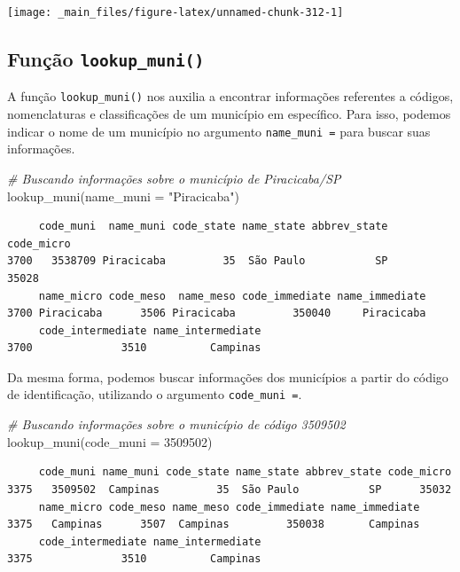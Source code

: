 \documentclass[
  brazilian,
]{book}
\newenvironment{Shaded}{\begin{snugshade}}{\end{snugshade}}
\newcommand{\AttributeTok}[1]{\textcolor[rgb]{0.77,0.63,0.00}{#1}}
\newcommand{\CommentTok}[1]{\textcolor[rgb]{0.56,0.35,0.01}{\textit{#1}}}
\newcommand{\DecValTok}[1]{\textcolor[rgb]{0.00,0.00,0.81}{#1}}
\newcommand{\FunctionTok}[1]{\textcolor[rgb]{0.00,0.00,0.00}{#1}}
\newcommand{\NormalTok}[1]{#1}
\newcommand{\StringTok}[1]{\textcolor[rgb]{0.31,0.60,0.02}{#1}}
\begin{document}
\begin{center}\texttt{[image: \_main\_files/figure-latex/unnamed-chunk-312-1]} \end{center}

\hypertarget{funuxe7uxe3o-lookup_muni}{%
\subsection{\texorpdfstring{Função \texttt{lookup\_muni()}}{Função lookup\_muni()}}\label{funuxe7uxe3o-lookup_muni}}

A função \texttt{lookup\_muni()} nos auxilia a encontrar informações referentes a códigos, nomenclaturas e classificações de um município em específico. Para isso, podemos indicar o nome de um município no argumento \texttt{name\_muni\ =} para buscar suas informações.

\begin{Shaded}
\begin{Highlighting}[]
\CommentTok{\# Buscando informações sobre o município de Piracicaba/SP}
\FunctionTok{lookup\_muni}\NormalTok{(}\AttributeTok{name\_muni =} \StringTok{"Piracicaba"}\NormalTok{)}
\end{Highlighting}
\end{Shaded}

\begin{verbatim}
     code_muni  name_muni code_state name_state abbrev_state code_micro
3700   3538709 Piracicaba         35  São Paulo           SP      35028
     name_micro code_meso  name_meso code_immediate name_immediate
3700 Piracicaba      3506 Piracicaba         350040     Piracicaba
     code_intermediate name_intermediate
3700              3510          Campinas
\end{verbatim}

Da mesma forma, podemos buscar informações dos municípios a partir do código de identificação, utilizando o argumento \texttt{code\_muni\ =}.

\begin{Shaded}
\begin{Highlighting}[]
\CommentTok{\# Buscando informações sobre o município de código 3509502}
\FunctionTok{lookup\_muni}\NormalTok{(}\AttributeTok{code\_muni =} \DecValTok{3509502}\NormalTok{)}
\end{Highlighting}
\end{Shaded}

\begin{verbatim}
     code_muni name_muni code_state name_state abbrev_state code_micro
3375   3509502  Campinas         35  São Paulo           SP      35032
     name_micro code_meso name_meso code_immediate name_immediate
3375   Campinas      3507  Campinas         350038       Campinas
     code_intermediate name_intermediate
3375              3510          Campinas
\end{verbatim}
\end{document}
